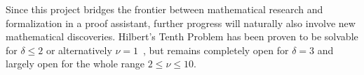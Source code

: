 \documentclass[a4paper,USenglish,cleveref,autoref,thm-restate]{lipics-v2021}
\begin{document}
Since this project bridges the frontier between mathematical research and formalization in a proof assistant, further progress will naturally also involve new mathematical discoveries. Hilbert's Tenth Problem has been proven to be solvable for $\delta \leq 2$ or alternatively $\nu = 1$~\cite{9var}, but remains completely open for $\delta = 3$ and largely open for the whole range $2 \leq \nu \leq 10$.




\end{document}
